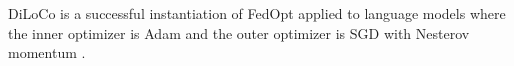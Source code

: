 
DiLoCo is a successful instantiation of FedOpt applied to language models where the inner optimizer is Adam \citep{kingma2014adam} and the outer optimizer is SGD with Nesterov momentum \citep{sutskever2013nesterov}. 






